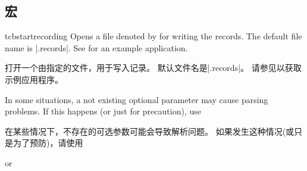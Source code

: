 \subsection{宏}\label{sec:recording-makros}
\begin{docCommand}[doc new=2014-11-28]{tcbstartrecording}{}
Opens a file denoted by  for writing the records.
The default file name is |\jobname.records|.
See  for an example application.

打开一个由指定的文件，用于写入记录。 默认文件名是|\jobname.records|。 请参见以获取示例应用程序。

\begin{marker}
In some situations, a not existing optional parameter may cause parsing problems. 
If this happens (or just for precaution), use

在某些情况下，不存在的可选参数可能会导致解析问题。%
如果发生这种情况(或只是为了预防)，请使用

\begin{dispListing}
\tcbstartrecording\relax
\end{dispListing}
  or
\begin{dispListing}
\end{dispListing}
  \end{marker}
\end{docCommand}

